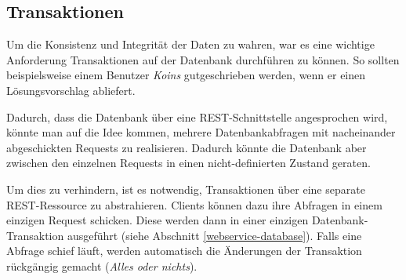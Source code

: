 \subsection{Transaktionen}
Um die Konsistenz und Integrität der Daten zu wahren, war es eine wichtige Anforderung Transaktionen auf der Datenbank durchführen zu können.
So sollten beispielsweise einem Benutzer \emph{Koins} gutgeschrieben werden, wenn er einen Lösungsvorschlag abliefert.

Dadurch, dass die Datenbank über eine \gls{REST}-Schnittstelle angesprochen wird, könnte man auf die Idee kommen, mehrere Datenbankabfragen mit nacheinander abgeschickten Requests zu realisieren.
Dadurch könnte die Datenbank aber zwischen den einzelnen Requests in einen nicht-definierten Zustand geraten.

Um dies zu verhindern, ist es notwendig, Transaktionen über eine separate \gls{REST}-Ressource zu abstrahieren.
Clients können dazu ihre Abfragen in einem einzigen Request schicken. Diese werden dann in einer einzigen Datenbank-Transaktion ausgeführt (siehe Abschnitt \ref{webservice-database}).
Falls eine Abfrage schief läuft, werden automatisch die Änderungen der Transaktion rückgängig gemacht (\emph{Alles oder nichts}).